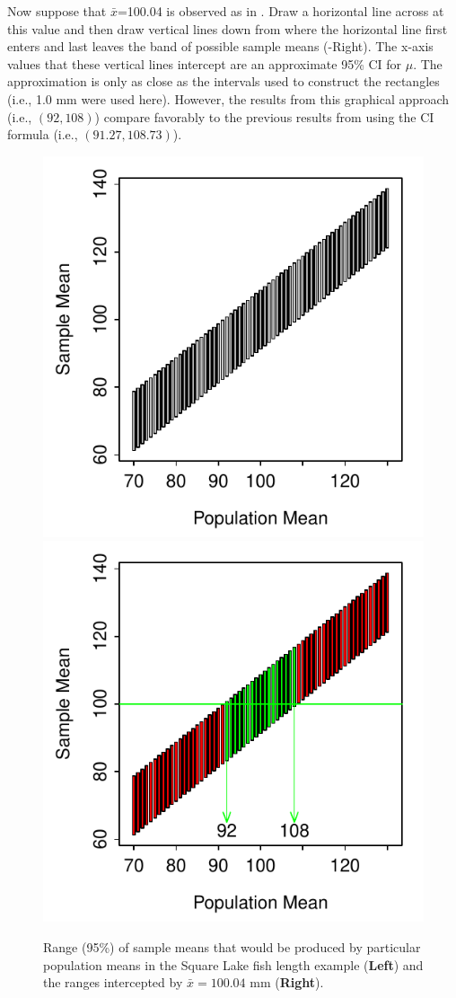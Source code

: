 \documentclass[10pt,openany]{book}\usepackage[]{graphicx}\usepackage[]{color}
\newenvironment{knitrout}{}{} %
\begin{document}
Now suppose that $\bar{x}$=100.04 is observed as in .  Draw a horizontal line across  at this value and then draw vertical lines down from where the horizontal line first enters and last leaves the band of possible sample means (-Right).  The x-axis values that these vertical lines intercept are an approximate 95\% CI for $\mu$.  The approximation is only as close as the intervals used to construct the rectangles (i.e., 1.0 mm were used here).  However, the results from this graphical approach (i.e., $(92,108)$) compare favorably to the previous results from using the CI formula (i.e., $(91.27,108.73)$).

\begin{knitrout}
\color{fgcolor}\begin{figure}[hbtp]

{\centering \includegraphics[width=.4\linewidth]{Figs/CIAlt1-1} 
\includegraphics[width=.4\linewidth]{Figs/CIAlt1-2} 

}

\caption{Range (95\%) of sample means that would be produced by particular population means in the Square Lake fish length example (\textbf{Left}) and the ranges intercepted by $\bar{x}=100.04$ mm (\textbf{Right}).}\label{fig:CIAlt1}
\end{figure}


\end{knitrout}
\end{document}
